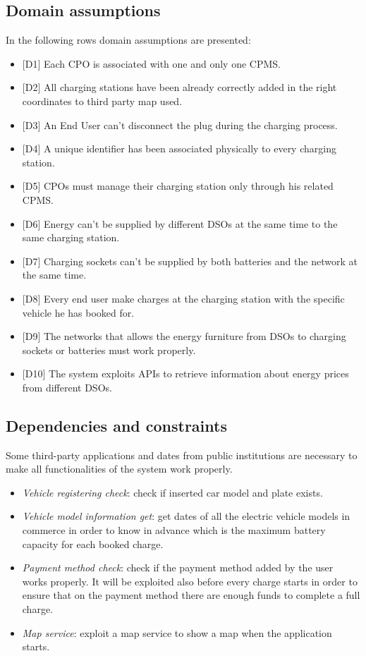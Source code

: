 \documentclass[a4paper]{report}
\begin{document}
\subsection{Domain assumptions}

In the following rows domain assumptions are presented:
\begin{itemize}
\item{[D1]} \label{D1} Each CPO is associated with one and only one CPMS.
\item{[D2]} \label{D2} All charging stations have been already correctly added in the right coordinates to third party map used.
\item{[D3]} \label{D3} An End User can't disconnect the plug during the charging process.
\item{[D4]} \label{D4} A unique identifier has been associated physically to every charging station.
\item{[D5]} \label{D5} CPOs must manage their charging station only through his related CPMS.
\item{[D6]} \label{D6} Energy can't be supplied by different DSOs at the same time to the same charging station.
\item{[D7]} \label{D7} Charging sockets can't be supplied by both batteries and the network at the same time.
\item{[D8]} \label{D8} Every end user make charges at the charging station with the specific vehicle he has booked for.
\item{[D9]} \label{D9} The networks that allows the energy furniture from DSOs to charging sockets or batteries must work properly.
\item{[D10]} \label{D10} The system exploits APIs to retrieve information about energy prices from different DSOs.
\end{itemize}
\subsection{Dependencies and constraints}
Some third-party applications and dates from public institutions are necessary to make all functionalities of the system work properly.
\begin{itemize}
    \item \textit{Vehicle registering check}: check if inserted car model and plate exists.
    \item \textit{Vehicle model information get}: get dates of all the electric vehicle models in commerce in order to know in advance which is the maximum battery capacity for each booked charge.
    \item \textit{Payment method check}: check if the payment method added by the user works properly. It will be exploited also before every charge starts in order to ensure that on the payment method there are enough funds to complete a full charge.
    \item \textit{Map service}: exploit a map service to show a map when the application starts.
\end{itemize}
\end{document}
